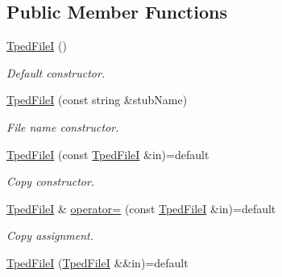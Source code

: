 \subsection*{Public Member Functions}
\begin{DoxyCompactItemize}
\item 
\mbox{\label{classsamp_files_1_1_tped_file_i_a227b3884053f76a1810a64eed8cee626}} 
\hyperlink{classsamp_files_1_1_tped_file_i_a227b3884053f76a1810a64eed8cee626}{Tped\+FileI} ()
\begin{DoxyCompactList}\small\item\em Default constructor. \end{DoxyCompactList}\item 
\hyperlink{classsamp_files_1_1_tped_file_i_aadd05bed48c0a265b0d95cf7e56b71de}{Tped\+FileI} (const string \&stub\+Name)
\begin{DoxyCompactList}\small\item\em File name constructor. \end{DoxyCompactList}\item 
\mbox{\label{classsamp_files_1_1_tped_file_i_a433516a26c02d7d23caaf0754d5e60e1}} 
\hyperlink{classsamp_files_1_1_tped_file_i_a433516a26c02d7d23caaf0754d5e60e1}{Tped\+FileI} (const \hyperlink{classsamp_files_1_1_tped_file_i}{Tped\+FileI} \&in)=default
\begin{DoxyCompactList}\small\item\em Copy constructor. \end{DoxyCompactList}\item 
\mbox{\label{classsamp_files_1_1_tped_file_i_aa2d5e06ed4e147caff30c43ab2afe9ff}} 
\hyperlink{classsamp_files_1_1_tped_file_i}{Tped\+FileI} \& \hyperlink{classsamp_files_1_1_tped_file_i_aa2d5e06ed4e147caff30c43ab2afe9ff}{operator=} (const \hyperlink{classsamp_files_1_1_tped_file_i}{Tped\+FileI} \&in)=default
\begin{DoxyCompactList}\small\item\em Copy assignment. \end{DoxyCompactList}\item 
\mbox{\label{classsamp_files_1_1_tped_file_i_ab4ecd80dc29da2a6c29ec98a24deb563}} 
\hyperlink{classsamp_files_1_1_tped_file_i_ab4ecd80dc29da2a6c29ec98a24deb563}{Tped\+FileI} (\hyperlink{classsamp_files_1_1_tped_file_i}{Tped\+FileI} \&\&in)=default

\end{DoxyCompactItemize}
